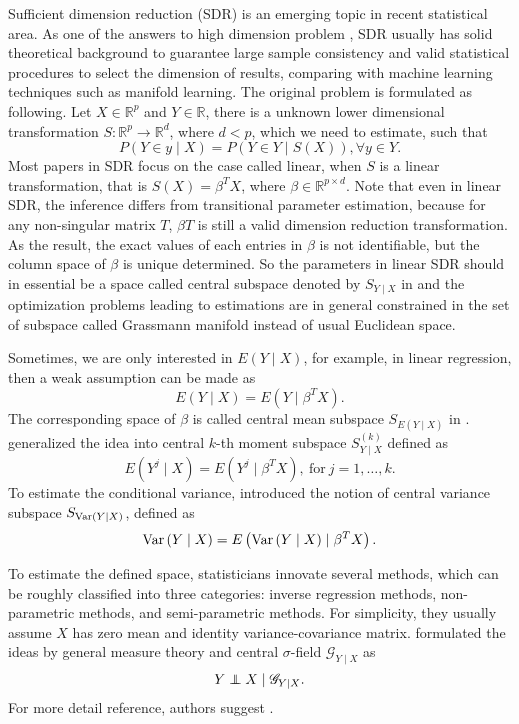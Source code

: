 Sufficient dimension reduction (SDR) is an emerging topic in recent
statistical area. As one of the answers to high dimension problem
, SDR usually has solid theoretical background to guarantee large
sample consistency and valid statistical procedures to select the
dimension of results, comparing with machine learning techniques such
as manifold learning. The original problem is formulated as following.
Let $X\in\mathbb{R}^{p}$ and $Y\in\mathbb{R}$, there is a unknown
lower dimensional transformation $S:\mathbb{R}^{p}\rightarrow\mathbb{R}^{d}$,
where $d<p$, which we need to estimate, such that 
\[
P\left(Y\in y\mid X\right)=P\left(Y\in Y\mid S\left(X\right)\right),\forall y\in Y.
\]
Most papers in SDR focus on the case called linear, when $S$ is a
linear transformation, that is $S\left(X\right)=\beta^{T}X$, where
$\beta\in\mathbb{R}^{p\times d}$. Note that even in linear SDR, the
inference differs from transitional parameter estimation, because
for any non-singular matrix $T$, $\beta T$ is still a valid dimension
reduction transformation. As the result, the exact values of each
entries in $\beta$ is not identifiable, but the column space of $\beta$
is unique determined. So the parameters in linear SDR should in essential
be a space called central subspace denoted by $S_{Y\mid X}$ in \citet{cook1994interpretation}
and the optimization problems leading to estimations are in general
constrained in the set of subspace called Grassmann manifold instead
of usual Euclidean space. %
\begin{comment}
non-linear dr by cond on sigma algebra
\end{comment}
Sometimes, we are only interested in $E\left(Y\mid X\right)$, for
example, in linear regression, then a weak assumption can be made
as 
\[
E\left(Y\mid X\right)=E\left(Y\mid\beta^{T}X\right).
\]
The corresponding space of $\beta$ is called central mean subspace
$S_{E\left(Y\mid X\right)}$ in \citet{cook2002dimension}. \citet{yin2002dimension}
generalized the idea into central $k$-th moment subspace $S_{Y\mid X}^{\left(k\right)}$
defined as 
\[
E\left(Y^{j}\mid X\right)=E\left(Y^{j}\mid\beta^{T}X\right),\mathrm{\: for\:}j=1,\ldots,k.
\]
 To estimate the conditional variance, \citet{zhu2009dimension} introduced
the notion of central variance subspace $S_{\mathrm{Var}\left(Y\mid X\right)}$,
defined as 
\[
\mathrm{Var}\left(Y\mid X\right)=E\left(\mathrm{Var}\left(Y\mid X\right)\mid\beta^{T}X\right).
\]


To estimate the defined space, statisticians innovate several methods,
which can be roughly classified into three categories: inverse regression
methods, non-parametric methods, and semi-parametric methods. For
simplicity, they usually assume $X$ has zero mean and identity variance-covariance
matrix. \citet{lee2013general} formulated the ideas by general measure
theory and central $\sigma$-field $\mathscr{G}_{Y\mid X}$ as 
\[
Y\independent X\mid\mathscr{G}_{Y\mid X}.
\]
 For more detail reference, authors suggest \citet{ma2013review}.


